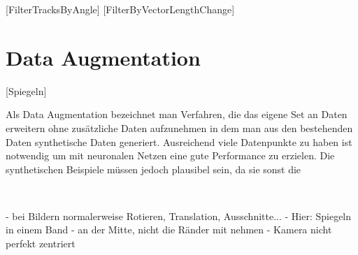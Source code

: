 [FilterTracksByAngle] [FilterByVectorLengthChange]

\section{Data Augmentation}

[Spiegeln]

Als Data Augmentation bezeichnet man Verfahren, die das eigene Set an Daten erweitern ohne zusätzliche Daten aufzunehmen
in dem man aus den bestehenden Daten synthetische Daten generiert.
Ausreichend viele Datenpunkte zu haben ist notwendig um mit neuronalen Netzen eine gute Performance zu erzielen.
Die synthetischen Beispiele müssen jedoch plausibel sein, da sie sonst die 

~~~

- bei Bildern normalerweise Rotieren, Translation, Ausschnitte...
- Hier: Spiegeln in einem Band - an der Mitte, nicht die Ränder mit nehmen - Kamera nicht perfekt zentriert